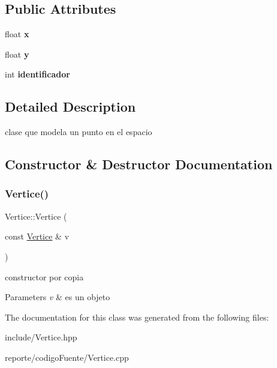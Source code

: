 \subsection*{Public Attributes}
\begin{DoxyCompactItemize}
\item 
\mbox{\label{class_vertice_abc7f97df103b9c53bf04e1c6f247c1fc}} 
float {\bfseries x}
\item 
\mbox{\label{class_vertice_aca05e79646b79df75ccf73f07b04d26e}} 
float {\bfseries y}
\item 
\mbox{\label{class_vertice_a923a1c1451729f490b42bbe35bdf20f1}} 
int {\bfseries identificador}
\end{DoxyCompactItemize}


\subsection{Detailed Description}
clase que modela un punto en el espacio 

\subsection{Constructor \& Destructor Documentation}
\mbox{\label{class_vertice_a8d8f3610b706a9e5d50e1138d9abea90}} 
\subsubsection{\texorpdfstring{Vertice()}{Vertice()}}
{\footnotesize\ttfamily Vertice\+::\+Vertice (\begin{DoxyParamCaption}\item[{const \hyperlink{class_vertice}{Vertice} \&}]{v }\end{DoxyParamCaption})}



constructor por copia 


\begin{DoxyParams}{Parameters}
{\em v} & es un objeto \\
\hline
\end{DoxyParams}


The documentation for this class was generated from the following files\+:\begin{DoxyCompactItemize}
\item 
include/Vertice.\+hpp\item 
reporte/codigo\+Fuente/Vertice.\+cpp\end{DoxyCompactItemize}
